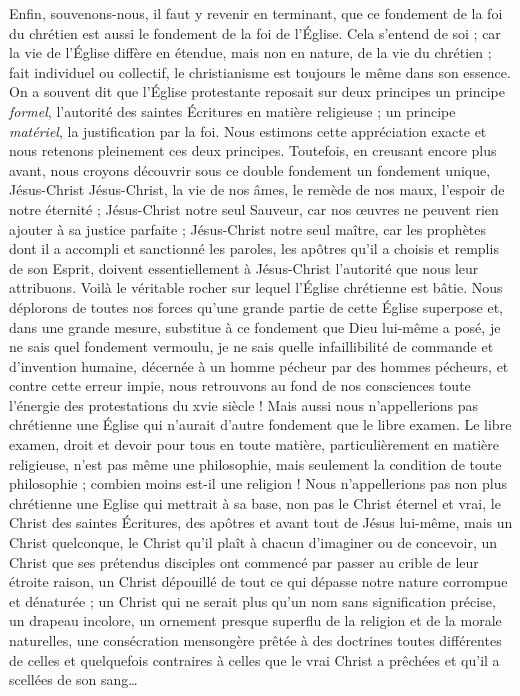 Enfin, souvenons-nous, il faut y revenir en terminant, que ce fondement de la foi du chrétien est aussi le fondement de la foi de l’Église. Cela s’entend de soi ; car la vie de l’Église diffère en étendue, mais non en nature, de la vie du chrétien ; fait individuel ou collectif, le christianisme est toujours le même dans son essence. On a souvent dit que l’Église protestante reposait sur deux principes\frcolon{} un principe \emph{formel}, l’autorité des saintes Écritures en matière religieuse ; un principe \emph{matériel}, la justification par la foi. Nous estimons cette appréciation exacte et nous retenons pleinement ces deux principes. Toutefois, en creusant encore plus avant, nous croyons découvrir sous ce double fondement un fondement unique, Jésus-Christ\frcolon{} Jésus-Christ, la vie de nos âmes, le remède de nos maux, l’espoir de notre éternité ; Jésus-Christ notre seul Sauveur, car nos œuvres ne peuvent rien ajouter à sa justice parfaite ; Jésus-Christ notre seul maître, car les prophètes dont il a accompli et sanctionné les paroles, les apôtres qu’il a choisis et remplis de son Esprit, doivent essentiellement à Jésus-Christ l’autorité que nous leur attribuons. Voilà le véritable rocher sur lequel l’Église chrétienne est bâtie. Nous déplorons de toutes nos forces qu’une grande partie de cette Église superpose et, dans une grande mesure, substitue à ce fondement que Dieu lui-même a posé, je ne sais quel fondement vermoulu, je ne sais quelle infaillibilité de commande et d’invention humaine, décernée à un homme pécheur par des hommes pécheurs, et contre cette erreur impie, nous retrouvons au fond de nos consciences toute l’énergie des protestations du xvie siècle ! \ocadr{} Mais aussi nous n’appellerions pas chrétienne une Église qui n’aurait d’autre fondement que le libre examen. Le libre examen, droit et devoir pour tous en toute matière, particulièrement en matière religieuse, n’est pas même une philosophie, mais seulement la condition de toute philosophie ; combien moins est-il une religion ! Nous n’appellerions pas non plus chrétienne une Eglise qui mettrait à sa base, non pas le Christ éternel et vrai, le Christ des saintes Écritures, des apôtres et avant tout de Jésus lui-même, mais un Christ quelconque, le Christ qu’il plaît à chacun d’imaginer ou de concevoir, un Christ que ses prétendus disciples ont commencé par passer au crible de leur étroite raison, un Christ dépouillé de tout ce qui dépasse notre nature corrompue et dénaturée ; un Christ qui ne serait plus qu’un nom sans signification précise, un drapeau incolore, un ornement presque superflu de la religion et de la morale naturelles, une consécration mensongère prêtée à des doctrines toutes différentes de celles \ocadr{} et quelquefois contraires à celles \fcadr{} que le vrai Christ a prêchées et qu’il a scellées de son sang…

